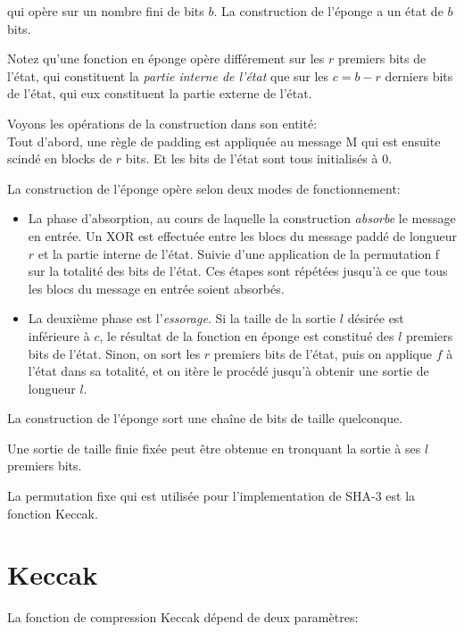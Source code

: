 \documentclass[10.5pt, a4paper, twoside, openright]{report}
\begin{document}
qui opère sur un nombre fini de bits $b$. La construction de l'éponge a un état de $b$ bits.

Notez qu'une fonction en éponge opère différement sur les $r$ premiers bits de l'état, qui constituent la \emph{partie interne de l'état} que sur les $c=b-r$ derniers bits de l'état, qui eux constituent la partie externe de l'état.

Voyons les opérations de la construction dans son entité:\\
Tout d'abord, une règle de padding est appliquée au message M qui est ensuite scindé en blocks de $r$ bits.
Et les bits de l'état sont tous initialisés à 0. 

La construction de l'éponge opère selon deux modes de fonctionnement:
\begin{itemize}
\item{La phase d'absorption, au cours de laquelle la construction \emph{absorbe} le message en entrée. 
Un XOR est effectuée entre les blocs du message paddé de longueur $r$ et la partie interne de l'état. Suivie d'une application de la permutation f sur la totalité des bits de l'état.
Ces étapes sont répétées jusqu'à ce que tous les blocs du message en entrée soient absorbés.}

\item{La deuxième phase est l'\emph{essorage}. Si la taille de la sortie $l$ désirée est inférieure à $c$, le résultat de la fonction en éponge est constitué des $l$ premiers bits de l'état. Sinon, on sort les $r$ premiers bits de l'état, puis on applique $f$ à l'état dans sa totalité, et on itère le procédé jusqu'à obtenir une sortie de longueur $l$.}
\end{itemize} 

La construction de l'éponge sort une chaîne de bits de taille quelconque.

Une sortie de taille finie fixée peut être obtenue en tronquant la sortie à ses $l$ premiers bits.



La permutation fixe qui est utilisée pour l'implementation de SHA-3 est la fonction Keccak.
\section{Keccak}
La fonction de compression Keccak dépend de deux paramètres:
\end{document}
